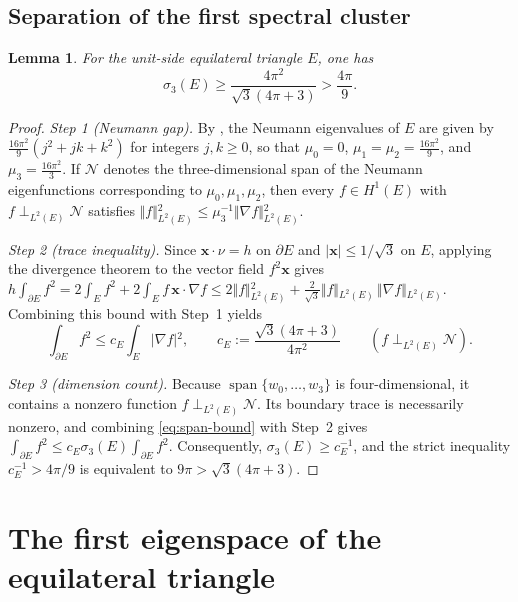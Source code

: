 \documentclass[11pt,reqno]{amsart}
\numberwithin{equation}{section}
\newtheorem{lemma}[lemma]{Lemma}
\theoremstyle{remark}
\begin{document}
\subsection{Separation of the first spectral cluster}
\begin{lemma}\label{lem:spectral-separation}
For the unit-side equilateral triangle $E$, one has
\begin{equation}\label{eq:third-steklov-gap}
 \sigma_3(E)\ge\frac{4\pi^2}{\sqrt3(4\pi+3)}>\frac{4\pi}{9}.
\end{equation}
\end{lemma}
\begin{proof}
\emph{Step 1 (Neumann gap).} By \cite{McCNeumann}, the Neumann eigenvalues
of $E$ are given by $\frac{16\pi^2}{9}(j^2+jk+k^2)$ for integers $j,k\ge0$, so that
$\mu_0=0$, $\mu_1=\mu_2=\frac{16\pi^2}{9}$, and $\mu_3=\frac{16\pi^2}{3}$.
If $\mathcal N$ denotes the three-dimensional span of the Neumann
eigenfunctions corresponding to $\mu_0,\mu_1,\mu_2$, then every $f\in H^1(E)$
with $f\perp_{L^2(E)}\mathcal N$ satisfies
$\Vert{}f\Vert{}_{L^2(E)}^2\le\mu_3^{-1}\Vert{}\nabla f\Vert{}_{L^2(E)}^2$.

\emph{Step 2 (trace inequality).} Since $\mathbf x\cdot\nu=h$ on
$\partial E$ and $\vert{}\mathbf x\vert{}\le1/\sqrt3$ on $E$, applying the divergence theorem
to the vector field $f^2\mathbf x$ gives
$h\int_{\partial E}f^2=2\int_Ef^2+2\int_Ef\,\mathbf x\cdot\nabla f \le2\Vert{}f\Vert{}_{L^2(E)}^2+\frac2{\sqrt3}\Vert{}f\Vert{}_{L^2(E)}\,\Vert{}\nabla f\Vert{}_{L^2(E)}$. Combining
this bound with Step~1 yields
\[\int_{\partial E}f^2\le c_E\int_E\vert{}\nabla f\vert{}^2,\qquad c_E:=\frac{\sqrt3(4\pi+3)}{4\pi^2}\qquad(f\perp_{L^2(E)}\mathcal N).\]

\emph{Step 3 (dimension count).} Because $\operatorname{span}\{w_0,\dots,w_3\}$
is four-dimensional, it contains a nonzero function $f\perp_{L^2(E)}\mathcal N$.
Its boundary trace is necessarily nonzero, and combining \eqref{eq:span-bound}
with Step~2 gives $\int_{\partial E}f^2\le c_E\sigma_3(E)\int_{\partial E}f^2$.
Consequently, $\sigma_3(E)\ge c_E^{-1}$, and the strict inequality
$c_E^{-1}>4\pi/9$ is equivalent to $9\pi>\sqrt3(4\pi+3)$.
\end{proof}

\section{The first eigenspace of the equilateral triangle}\label{sec:exact}
\end{document}
